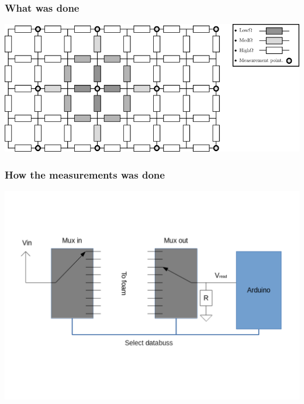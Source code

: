 \documentclass{beamer}
\begin{document}
\begin{frame}
    \frametitle{What was done}
    \begin{center}
        \includegraphics[width=.8\textwidth]{img/resistor_mapp_modell.png}
    \end{center}
\end{frame}

\begin{frame}
    \frametitle{How the measurements was done}
    \begin{center}
        \includegraphics[width=.8\textwidth]{img/arduino_foam.png}
    \end{center}
\end{frame}
\end{document}
